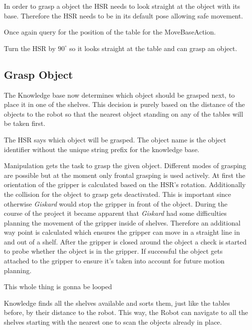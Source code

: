 \documentclass[main.tex]{subfiles}
\begin{document}
	In order to grasp a object the HSR needs to look straight at the object with its base. Therefore the HSR needs to be in its default pose allowing safe movement.
	
	
	Once again query for the position of the table for the MoveBaseAction.
	
	Turn the HSR by $90^\circ$ so it looks straight at the table and can grasp an object.
	
	\subsection{Grasp Object}
	
	The Knowledge base now determines which object should be grasped next, to place it in one of the shelves. This decision is purely based on the distance of the objects to the robot so that the nearest object standing on any of the tables will be taken first.
	
	The HSR says which object will be grasped. The object name is the object identifier without the unique string prefix for the knowledge base.
	
	Manipulation gets the task to grasp the given object. Different modes of grasping are possible but at the moment only frontal grasping is used actively. At first the orientation of the gripper is calculated based on the HSR's rotation. Additionally the collision for the object to grasp gets deactivated. This is important since otherwise \textit{Giskard} would stop the gripper in front of the object. During the course of the project it became apparent that \textit{Giskard} had some difficulties planning the movement of the gripper inside of shelves. Therefore an additional way point is calculated which ensures the gripper can move in a straight line in and out of a shelf. After the gripper is closed around the object a check is started to probe whether the object is in the gripper. If successful the object gets attached to the gripper to ensure it's taken into account for future motion planning.   
	
	This whole thing is gonna be looped 
	
	
	Knowledge finds all the shelves available and sorts them, just like the tables before, by their distance to the robot. This way, the Robot can navigate to all the shelves starting with the nearest one to scan the objects already in place.
	
\end{document}

